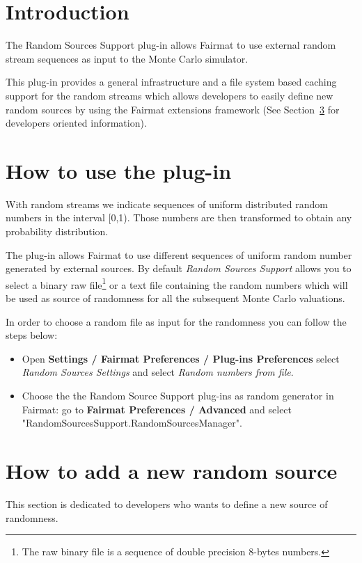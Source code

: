\newcommand{\pluginName}{Random Sources Support}
\newcommand{\pluginVersion}{1.0}



\section{Introduction}

The Random Sources Support plug-in allows Fairmat to use external random stream sequences as input to the Monte Carlo simulator.

This plug-in provides a general infrastructure and a file system based caching support for the random streams which allows developers to easily define new random sources by using the Fairmat extensions framework (See Section~\ref{sec.dev} for developers oriented information). 

\section{How to use the plug-in}

With random streams we indicate sequences of uniform distributed random numbers in the interval [0,1). Those numbers are then transformed to obtain any probability distribution.

The plug-in allows Fairmat to use different sequences of uniform random number generated by external sources. 
By default \emph{Random Sources Support} allows you to select a binary raw file\footnote{The raw binary file is a sequence of double precision 8-bytes numbers.} or a text file containing the random numbers which will be used as source of randomness for all the subsequent Monte Carlo valuations.

In order to choose a random file as input for the randomness you can follow the steps below:

\begin{itemize}
\item Open \textbf{Settings / Fairmat Preferences / Plug-ins Preferences} select \emph{Random Sources Settings} and select \emph{Random numbers from file}.
\item Choose the  the Random Source Support plug-ins as random generator in Fairmat: go to \textbf{Fairmat Preferences / Advanced} and select "RandomSourcesSupport.RandomSourcesManager".
\end{itemize}

\section{How to add a new random source}
\label{sec.dev}
This section is dedicated to developers who wants to define a new source of randomness.

